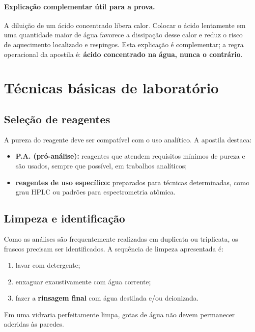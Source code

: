\documentclass[a4paper,12pt]{article}
\begin{document}
\paragraph{Explicação complementar útil para a prova.}
A diluição de um ácido concentrado libera calor. Colocar o ácido lentamente em uma quantidade maior de água favorece a dissipação desse calor e reduz o risco de aquecimento localizado e respingos. Esta explicação é complementar; a regra operacional da apostila é: \textbf{ácido concentrado na água, nunca o contrário}.

\section{Técnicas básicas de laboratório}

\subsection{Seleção de reagentes}

A pureza do reagente deve ser compatível com o uso analítico. A apostila destaca:

\begin{itemize}[leftmargin=1.6em]
    \item \textbf{P.A. (pró-análise):} reagentes que atendem requisitos mínimos de pureza e são usados, sempre que possível, em trabalhos analíticos;
    \item \textbf{reagentes de uso específico:} preparados para técnicas determinadas, como grau HPLC ou padrões para espectrometria atômica.
\end{itemize}

\subsection{Limpeza e identificação}

Como as análises são frequentemente realizadas em duplicata ou triplicata, os frascos precisam ser identificados. A sequência de limpeza apresentada é:

\begin{procedimento}
\begin{enumerate}[leftmargin=1.7em]
    \item lavar com detergente;
    \item enxaguar exaustivamente com água corrente;
    \item fazer a \textbf{rinsagem final} com água destilada e/ou deionizada.
\end{enumerate}
Em uma vidraria perfeitamente limpa, gotas de água não devem permanecer aderidas às paredes.
\end{procedimento}
\end{document}
